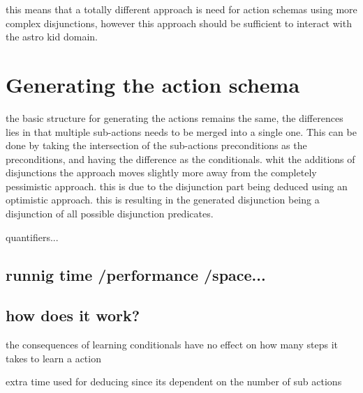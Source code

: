 	 this means that a totally different approach is need for action schemas using more complex disjunctions, however this approach should be sufficient to interact with the astro kid domain.
	 

	

%	
	
\section{Generating the action schema}	

	the basic structure for generating the actions remains the same, the differences lies in that multiple sub-actions needs to be merged into a single one. This can be done by taking the intersection of the sub-actions preconditions as the preconditions, and having the difference as the conditionals. whit the additions of disjunctions the approach moves slightly more away from the completely pessimistic approach. this is due to the disjunction part being deduced using an optimistic approach. this is resulting in the generated disjunction being a disjunction of all possible disjunction predicates.
	
	
	
	quantifiers...
	
\subsection{runnig time /performance /space...}
	
\subsection{how does it work?}	
	
	the consequences of learning conditionals have no effect on how many steps it takes to learn a action
	
	extra time used for deducing since its dependent on the number of sub actions